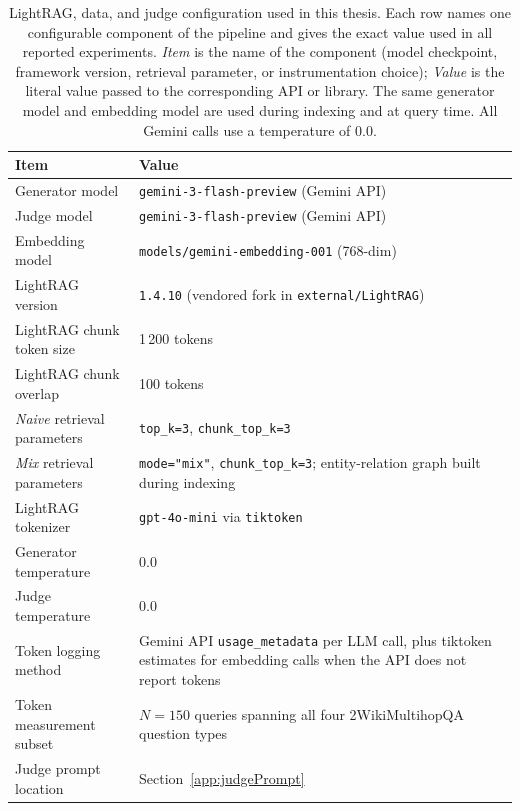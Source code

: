 \documentclass[english, bibtex]{kththesis}               %
\numberwithin{listing}{chapter}
\begin{document}
\begin{table}[!ht]
\centering
\caption{LightRAG, data, and judge configuration used in this thesis. Each row names one configurable component of the pipeline and gives the exact value used in all reported experiments. \emph{Item} is the name of the component (model checkpoint, framework version, retrieval parameter, or instrumentation choice); \emph{Value} is the literal value passed to the corresponding API or library. The same generator model and embedding model are used during indexing and at query time. All Gemini calls use a temperature of $0.0$.}
\label{tab:lightragDataJudgeConfig}
\begin{tabularx}{\textwidth}{p{}|X}
\textbf{Item} & \textbf{Value} \\
\hline
Generator model & \texttt{gemini-3-flash-preview} (Gemini API) \\
Judge model & \texttt{gemini-3-flash-preview} (Gemini API) \\
Embedding model & \texttt{models/gemini-embedding-001} (768-dim) \\
LightRAG version & \texttt{1.4.10} (vendored fork in \texttt{external/LightRAG}) \\
LightRAG chunk token size & 1\,200 tokens \\
LightRAG chunk overlap & 100 tokens \\
\emph{Naive} retrieval parameters & \texttt{top\_k=3}, \texttt{chunk\_top\_k=3} \\
\emph{Mix} retrieval parameters & \texttt{mode="mix"}, \texttt{chunk\_top\_k=3}; entity-relation graph built during indexing \\
LightRAG tokenizer & \texttt{gpt-4o-mini} via \texttt{tiktoken} \\
Generator temperature & 0.0 \\
Judge temperature & 0.0 \\
Token logging method & Gemini API \texttt{usage\_metadata} per LLM call, plus tiktoken estimates for embedding calls when the API does not report tokens \\
Token measurement subset & \(N = 150\) queries spanning all four 2WikiMultihopQA question types \\
Judge prompt location & Section~\ref{app:judgePrompt} \\
\end{tabularx}
\end{table}
\end{document}
